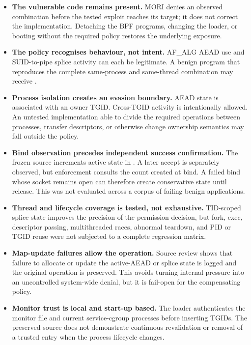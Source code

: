\begin{itemize}
    \item
    \textbf{The vulnerable code remains present.} MORI denies an observed
    combination before the tested exploit reaches its target; it does not
    correct the  implementation. Detaching the BPF programs,
    changing the loader, or booting without the required policy restores the
    underlying exposure.

    \item
    \textbf{The policy recognises behaviour, not intent.} AF\_ALG AEAD use and
    SUID-to-pipe splice activity can each be legitimate. A benign program that
    reproduces the complete same-process and same-thread combination may receive
    .

    \item
    \textbf{Process isolation creates an evasion boundary.} AEAD state is
    associated with an owner TGID. Cross-TGID activity is intentionally allowed.
    An untested implementation able to divide the required operations between
    processes, transfer descriptors, or otherwise change ownership semantics
    may fall outside the policy.

    \item
    \textbf{Bind observation precedes independent success confirmation.} The
    frozen source increments active state in . A later
    accept is separately observed, but enforcement consults the count created
    at bind. A failed bind whose socket remains open can therefore create
    conservative state until release. This was not evaluated across a corpus of
    failing benign applications.

    \item
    \textbf{Thread and lifecycle coverage is tested, not exhaustive.} TID-scoped
    splice state improves the precision of the permission decision, but fork,
    exec, descriptor passing, multithreaded races, abnormal teardown, and PID or
    TGID reuse were not subjected to a complete regression matrix.

    \item
    \textbf{Map-update failures allow the operation.} Source review shows that
    failure to allocate or update the active-AEAD or splice state is logged and
    the original operation is preserved. This avoids turning internal pressure
    into an uncontrolled system-wide denial, but it is fail-open for the
    compensating policy.

    \item
    \textbf{Monitor trust is local and start-up based.} The loader authenticates
    the monitor file and current service-cgroup processes before inserting TGIDs.
    The preserved source does not demonstrate continuous revalidation or removal
    of a trusted entry when the process lifecycle changes.


\end{itemize}
